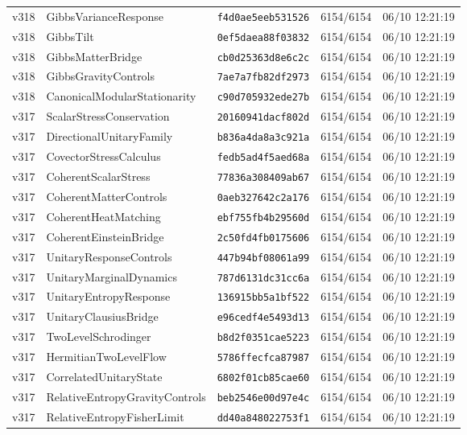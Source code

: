 \documentclass[11pt]{article}
\theoremstyle{definition}\newtheorem{deriv}{Derivation}
\begin{document}
{\begin{longtable}{@{}lllll@{}}
v318 & GibbsVarianceResponse & \texttt{f4d0ae5eeb531526} & 6154/6154 & 06/10 12:21:19 \\
v318 & GibbsTilt & \texttt{0ef5daea88f03832} & 6154/6154 & 06/10 12:21:19 \\
v318 & GibbsMatterBridge & \texttt{cb0d25363d8e6c2c} & 6154/6154 & 06/10 12:21:19 \\
v318 & GibbsGravityControls & \texttt{7ae7a7fb82df2973} & 6154/6154 & 06/10 12:21:19 \\
v318 & CanonicalModularStationarity & \texttt{c90d705932ede27b} & 6154/6154 & 06/10 12:21:19 \\
v317 & ScalarStressConservation & \texttt{20160941dacf802d} & 6154/6154 & 06/10 12:21:19 \\
v317 & DirectionalUnitaryFamily & \texttt{b836a4da8a3c921a} & 6154/6154 & 06/10 12:21:19 \\
v317 & CovectorStressCalculus & \texttt{fedb5ad4f5aed68a} & 6154/6154 & 06/10 12:21:19 \\
v317 & CoherentScalarStress & \texttt{77836a308409ab67} & 6154/6154 & 06/10 12:21:19 \\
v317 & CoherentMatterControls & \texttt{0aeb327642c2a176} & 6154/6154 & 06/10 12:21:19 \\
v317 & CoherentHeatMatching & \texttt{ebf755fb4b29560d} & 6154/6154 & 06/10 12:21:19 \\
v317 & CoherentEinsteinBridge & \texttt{2c50fd4fb0175606} & 6154/6154 & 06/10 12:21:19 \\
v317 & UnitaryResponseControls & \texttt{447b94bf08061a99} & 6154/6154 & 06/10 12:21:19 \\
v317 & UnitaryMarginalDynamics & \texttt{787d6131dc31cc6a} & 6154/6154 & 06/10 12:21:19 \\
v317 & UnitaryEntropyResponse & \texttt{136915bb5a1bf522} & 6154/6154 & 06/10 12:21:19 \\
v317 & UnitaryClausiusBridge & \texttt{e96cedf4e5493d13} & 6154/6154 & 06/10 12:21:19 \\
v317 & TwoLevelSchrodinger & \texttt{b8d2f0351cae5223} & 6154/6154 & 06/10 12:21:19 \\
v317 & HermitianTwoLevelFlow & \texttt{5786ffecfca87987} & 6154/6154 & 06/10 12:21:19 \\
v317 & CorrelatedUnitaryState & \texttt{6802f01cb85cae60} & 6154/6154 & 06/10 12:21:19 \\
v317 & RelativeEntropyGravityControls & \texttt{beb2546e00d97e4c} & 6154/6154 & 06/10 12:21:19 \\
v317 & RelativeEntropyFisherLimit & \texttt{dd40a848022753f1} & 6154/6154 & 06/10 12:21:19 \\

\end{longtable}}
\end{document}
